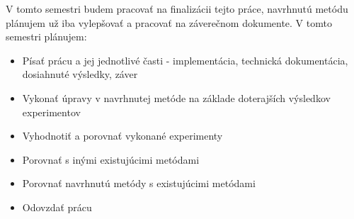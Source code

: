     V tomto semestri budem pracovať na finalizácii tejto práce, navrhnutú metódu plánujem už iba vylepšovať a pracovať na záverečnom dokumente. V tomto semestri plánujem:
        
    \begin{itemize}
        \item Písať prácu a jej jednotlivé časti - implementácia, technická dokumentácia, dosiahnuté výsledky, záver
        \item Vykonať úpravy v navrhnutej metóde na základe doterajších výsledkov experimentov
        \item Vyhodnotiť a porovnať vykonané experimenty
        \item Porovnať s inými existujúcimi metódami
        \item Porovnať navrhnutú metódy s existujúcimi metódami
        \item Odovzdať prácu
    \end{itemize}
    
    